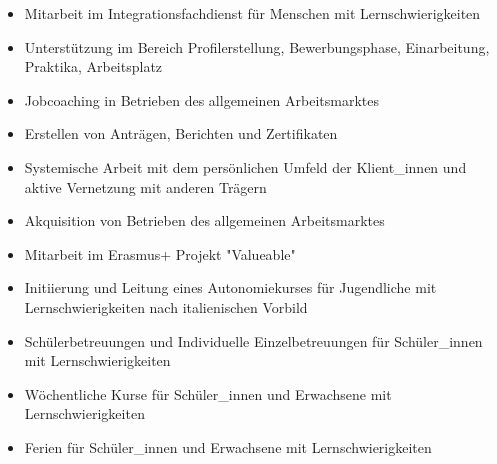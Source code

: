 \documentclass[10pt,a4paper]{altacv}
\begin{document}
  \divider

  \divider

  \divider

  \begin{itemize}
    \item{Mitarbeit im Integrationsfachdienst für Menschen mit Lernschwierigkeiten}
    \item{Unterstützung im Bereich Profilerstellung, Bewerbungsphase, Einarbeitung, Praktika, Arbeitsplatz}
    \item {Jobcoaching in Betrieben des allgemeinen Arbeitsmarktes}
    \item {Erstellen von Anträgen, Berichten und Zertifikaten}
    \item {Systemische Arbeit mit dem persönlichen Umfeld der Klient\_innen und aktive Vernetzung mit anderen Trägern}
    \item {Akquisition von Betrieben des allgemeinen Arbeitsmarktes}
    \item {Mitarbeit im Erasmus+ Projekt "Valueable"}
  \end{itemize}
  \divider

  \begin{itemize}
    \item{Initiierung und Leitung eines Autonomiekurses für Jugendliche mit Lernschwierigkeiten nach italienischen Vorbild}
    \item {Schülerbetreuungen und Individuelle Einzelbetreuungen für Schüler\_innen mit Lernschwierigkeiten}
    \item {Wöchentliche Kurse für Schüler\_innen und Erwachsene mit Lernschwierigkeiten}
    \item {Ferien für Schüler\_innen und Erwachsene mit Lernschwierigkeiten}
  \end{itemize}
  \divider
\end{document}
